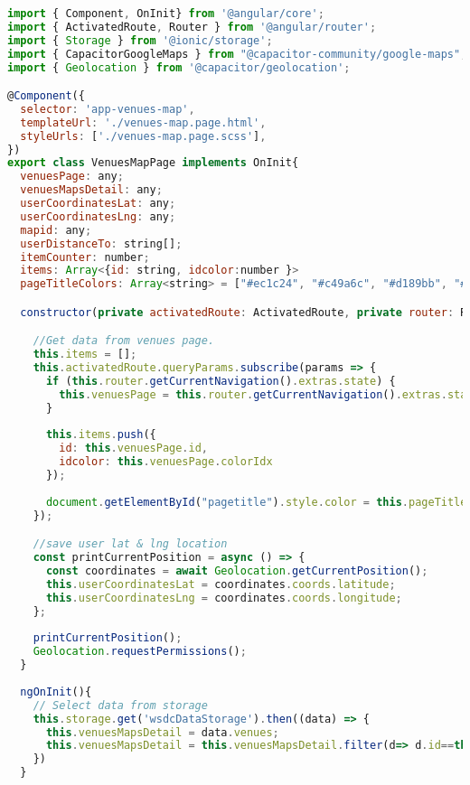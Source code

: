 \begin{lstlisting}[language=JavaScript, label={lst:venues-map.page.ts}, caption=venues-map.page.ts]
import { Component, OnInit} from '@angular/core';
import { ActivatedRoute, Router } from '@angular/router';
import { Storage } from '@ionic/storage';
import { CapacitorGoogleMaps } from "@capacitor-community/google-maps";
import { Geolocation } from '@capacitor/geolocation';

@Component({
  selector: 'app-venues-map',
  templateUrl: './venues-map.page.html',
  styleUrls: ['./venues-map.page.scss'],
})
export class VenuesMapPage implements OnInit{
  venuesPage: any;
  venuesMapsDetail: any;
  userCoordinatesLat: any;
  userCoordinatesLng: any;
  mapid: any;
  userDistanceTo: string[];
  itemCounter: number;
  items: Array<{id: string, idcolor:number }>
  pageTitleColors: Array<string> = ["#ec1c24", "#c49a6c", "#d189bb", "#4d113f"];

  constructor(private activatedRoute: ActivatedRoute, private router: Router,private storage: Storage) {

    //Get data from venues page.
    this.items = [];
    this.activatedRoute.queryParams.subscribe(params => {
      if (this.router.getCurrentNavigation().extras.state) {
        this.venuesPage = this.router.getCurrentNavigation().extras.state.venuesData;
      }
      
      this.items.push({
        id: this.venuesPage.id,
        idcolor: this.venuesPage.colorIdx
      });
      
      document.getElementById("pagetitle").style.color = this.pageTitleColors[this.items[0].idcolor-1];
    });

    //save user lat & lng location
    const printCurrentPosition = async () => {
      const coordinates = await Geolocation.getCurrentPosition();
      this.userCoordinatesLat = coordinates.coords.latitude;
      this.userCoordinatesLng = coordinates.coords.longitude;
    };
    
    printCurrentPosition();
    Geolocation.requestPermissions();
  }
  
  ngOnInit(){
    // Select data from storage
    this.storage.get('wsdcDataStorage').then((data) => {
      this.venuesMapsDetail = data.venues;
      this.venuesMapsDetail = this.venuesMapsDetail.filter(d=> d.id==this.items[0].id);
    })
  }


\end{lstlisting}
